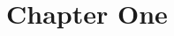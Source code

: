 \documentclass[../main.tex]{subfiles}
\begin{document}
\section{Chapter One}

\lipsum[1-3]
\end{document}
